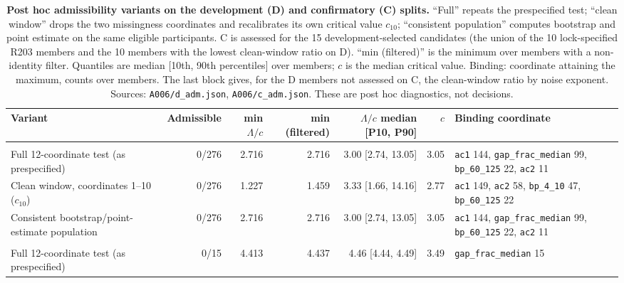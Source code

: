 \begin{table}[ht]
\centering
\caption{\textbf{Post hoc admissibility variants on the development (D) and confirmatory (C) splits.} ``Full'' repeats the prespecified test; ``clean window'' drops the two missingness coordinates and recalibrates its own critical value $c_{10}$; ``consistent population'' computes bootstrap and point estimate on the same eligible participants. C is assessed for the 15 development-selected candidates (the union of the 10 lock-specified R203 members and the 10 members with the lowest clean-window ratio on D). ``min (filtered)'' is the minimum over members with a non-identity filter. Quantiles are median [10th, 90th percentiles] over members; $c$ is the median critical value. Binding: coordinate attaining the maximum, counts over members. The last block gives, for the D members not assessed on C, the clean-window ratio by noise exponent. Sources: \texttt{A006/d\_adm.json}, \texttt{A006/c\_adm.json}. These are post hoc diagnostics, not decisions.}
\label{tab:s2}
\footnotesize
\setlength{\tabcolsep}{3pt}
\begin{adjustbox}{max width=\textwidth}
\begin{tabular}{@{}>{\raggedright\arraybackslash}p{3.6cm}rrrrr>{\raggedright\arraybackslash}p{3.4cm}@{}}
\toprule
Variant & Admissible & min $\Lambda/c$ & min (filtered) & $\Lambda/c$ median [P10, P90] & $c$ & Binding coordinate \\
\midrule
\multicolumn{7}{@{}l}{\textit{Development split D, all 276 members}} \\
\quad Full 12-coordinate test (as prespecified) & 0/276 & 2.716 & 2.716 & 3.00 [2.74, 13.05] & 3.05 & \texttt{ac1} 144, \texttt{gap\_frac\_median} 99, \texttt{bp\_60\_125} 22, \texttt{ac2} 11 \\
\quad Clean window, coordinates 1--10 ($c_{10}$) & 0/276 & 1.227 & 1.459 & 3.33 [1.66, 14.16] & 2.77 & \texttt{ac1} 149, \texttt{ac2} 58, \texttt{bp\_4\_10} 47, \texttt{bp\_60\_125} 22 \\
\quad Consistent bootstrap/point-estimate population & 0/276 & 2.716 & 2.716 & 3.00 [2.74, 13.05] & 3.05 & \texttt{ac1} 144, \texttt{gap\_frac\_median} 99, \texttt{bp\_60\_125} 22, \texttt{ac2} 11 \\
\addlinespace
\multicolumn{7}{@{}l}{\textit{Confirmatory split C, 15 development-selected candidates}} \\
\quad Full 12-coordinate test (as prespecified) & 0/15 & 4.413 & 4.437 & 4.46 [4.44, 4.49] & 3.49 & \texttt{gap\_frac\_median} 15 \\

\end{tabular}
\end{adjustbox}
\end{table}
